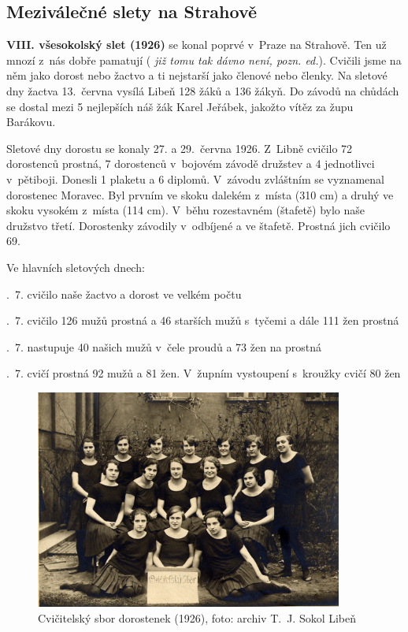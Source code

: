 \documentclass[a5paper, 11pt, twoside]{article}
\newcommand{\pozned}[1]{%
\textit{#1}}
\begin{document}
\subsection{Meziválečné slety na Strahově}

\textbf{VIII. všesokolský slet (1926)} se konal poprvé v~Praze na
Strahově. Ten už mnozí z~nás dobře pamatují (\pozned{již tomu tak dávno
není, pozn. ed.}). Cvičili jsme na něm jako dorost nebo žactvo a ti
nejstarší jako členové nebo členky. Na sletové dny žactva 13.~června
vysílá Libeň 128 žáků a 136 žákyň. Do závodů na chůdách se dostal mezi 5
nejlepších náš žák Karel Jeřábek, jakožto vítěz za župu Barákovu.

Sletové dny dorostu se konaly 27. a 29.~června 1926. Z~Libně cvičilo 72
dorostenců prostná, 7 dorostenců v~bojovém závodě družstev a 4
jednotlivci v~pětiboji. Donesli 1 plaketu a 6 diplomů. V~závodu
zvláštním se vyznamenal dorostenec Moravec. Byl prvním ve skoku dalekém
z~místa (310 cm) a druhý ve skoku vysokém z~místa (114 cm). V~běhu
rozestavném (štafetě) bylo naše družstvo třetí. Dorostenky závodily
v~odbíjené a ve štafetě. Prostná jich cvičilo 69.

\medskip
Ve hlavních sletových dnech:
\medskip

.~7. cvičilo naše žactvo a dorost ve velkém počtu

.~7. cvičilo 126 mužů prostná a 46 starších mužů s~tyčemi a dále 111
žen prostná

.~7. nastupuje 40 našich mužů v~čele proudů a 73 žen na prostná

.~7. cvičí prostná 92 mužů a 81 žen. V~župním vystoupení s~kroužky
cvičí 80 žen
\medskip

\begin{figure}[h!]
  \centering 
  \includegraphics[width=0.9\textwidth]{img/27_dorostenky.jpg}
  \caption*{Cvičitelský sbor dorostenek (1926), foto: archiv T.~J. Sokol
  Libeň}
\end{figure}
\end{document}
